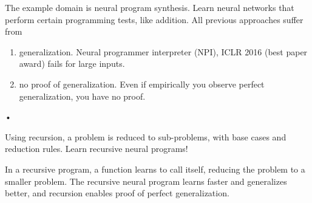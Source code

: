 The example domain is neural program synthesis. Learn neural networks that perform certain programming tests, like addition. All previous approaches suffer from
\begin{enumerate}
\item
generalization. Neural programmer interpreter (NPI), ICLR 2016 (best paper award) fails for large inputs.
\item
no proof of generalization. Even if empirically you observe perfect generalization, you have no proof.
\end{enumerate}•

%
Using recursion, a problem is reduced to sub-problems, with base cases and reduction rules. Learn recursive neural programs!

In a recursive program, a function learns to call itself, reducing the problem to a smaller problem.
The recursive neural program learns faster and generalizes better, and recursion enables proof of perfect generalization.

